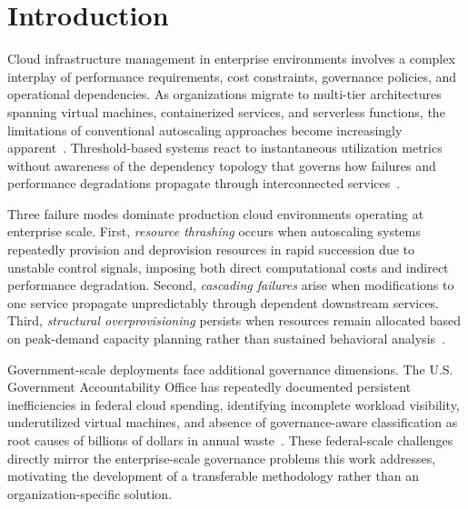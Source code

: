 \documentclass[runningheads]{llncs}
\begin{document}
\section{Introduction}
\label{sec:intro}

Cloud infrastructure management in enterprise environments involves a complex interplay of performance requirements, cost constraints, governance policies, and operational dependencies. As organizations migrate to multi-tier architectures spanning virtual machines, containerized services, and serverless functions, the limitations of conventional autoscaling approaches become increasingly apparent~\cite{lorido}. Threshold-based systems react to instantaneous utilization metrics without awareness of the dependency topology that governs how failures and performance degradations propagate through interconnected services~\cite{alharthi}.

Three failure modes dominate production cloud environments operating at enterprise scale. First, \emph{resource thrashing} occurs when autoscaling systems repeatedly provision and deprovision resources in rapid succession due to unstable control signals, imposing both direct computational costs and indirect performance degradation. Second, \emph{cascading failures} arise when modifications to one service propagate unpredictably through dependent downstream services. Third, \emph{structural overprovisioning} persists when resources remain allocated based on peak-demand capacity planning rather than sustained behavioral analysis~\cite{abdullah}.

Government-scale deployments face additional governance dimensions. The U.S. Government Accountability Office has repeatedly documented persistent inefficiencies in federal cloud spending, identifying incomplete workload visibility, underutilized virtual machines, and absence of governance-aware classification as root causes of billions of dollars in annual waste~\cite{gao_cloud1,gao_cloud2}. These federal-scale challenges directly mirror the enterprise-scale governance problems this work addresses, motivating the development of a transferable methodology rather than an organization-specific solution.
\end{document}
